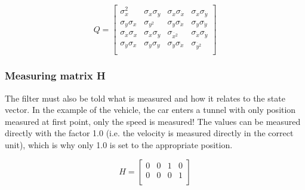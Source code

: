 \begin{equation}
Q = \begin{bmatrix} 
\sigma^2_{x} & \sigma_{x}\sigma_{y} & \sigma_{x}\sigma_{\dot{x}} & \sigma_{x}\sigma_{\dot{y}} \\
\sigma_{y}\sigma_{x} & \sigma_{y^2} & \sigma_{y}\sigma_{\dot{x}} & \sigma_{y}\sigma_{\dot{y}} \\
\sigma_{\dot{x}}\sigma_{x} & \sigma_{\dot{x}}\sigma_{y} & \sigma_{\dot{x^2}} & \sigma_{\dot{x}}\sigma_{\dot{y}} \\
\sigma_{\dot{y}}\sigma_{x} & \sigma_{\dot{y}}\sigma_{y} & \sigma_{\dot{y}}\sigma_{\dot{x}} & \sigma_{\dot{y^2}} \\
\end{bmatrix}
\end{equation}



\subsubsection{Measuring matrix H}
The filter must also be told what is measured and how it relates to the state vector. In the example of the vehicle, the car enters a tunnel with only position measured at first point, only the speed is measured! The values can be measured directly with the factor 1.0 (i.e. the velocity is measured directly in the correct unit), which is why only 1.0 is set to the appropriate position.

\begin{equation}
H = \begin{bmatrix} 
0 & 0 & 1 & 0 \\
0 & 0 & 0 & 1 \\
\end{bmatrix}
\end{equation}






